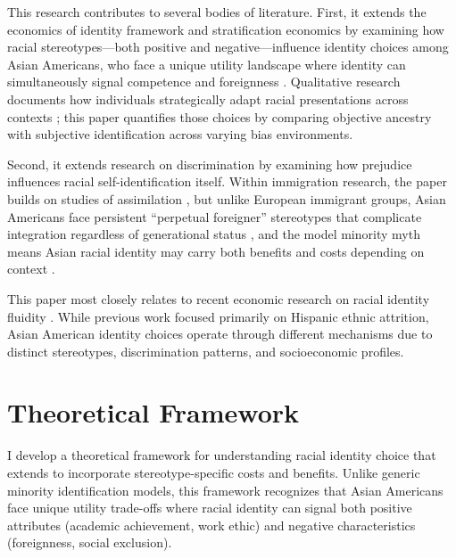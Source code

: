 \documentclass[12pt,english]{article}
\begin{document}
This research contributes to several bodies of literature. First, it extends the economics of identity framework \autocite{akerlofEconomicsIdentity2000} and stratification economics \autocite{darityEconomicsIdentityOrigin2006,darityPositionPossessionsStratification2022} by examining how racial stereotypes---both positive and negative---influence identity choices among Asian Americans, who face a unique utility landscape where identity can simultaneously signal competence and foreignness \autocite{charnessSocialIdentityGroup2020,atkinHowWeChoose2021,goldsmithDarkLightSkin2007,hamiltonSheddingLightMarriage2009,dietteSkinShadeStratification2015}. Qualitative research documents how individuals strategically adapt racial presentations across contexts \autocite{waters1990ethnic,telles2008generations,zhou1997segmented,cornell2006ethnicity}; this paper quantifies those choices by comparing objective ancestry with subjective identification across varying bias environments.

Second, it extends research on discrimination \autocite{bertrandAreEmilyGreg2004,charlesPrejudiceWagesEmpirical2008,bursztynImmigrantNextDoor2022,bordaloStereotypes2016} by examining how prejudice influences racial self-identification itself. Within immigration research, the paper builds on studies of assimilation \autocite{abramitzkyCulturalAssimilationAge2016,abramitzkyNationImmigrantsAssimilation2014}, but unlike European immigrant groups, Asian Americans face persistent ``perpetual foreigner'' stereotypes that complicate integration regardless of generational status \autocite{foukaImmigrantsAmericansRace2022}, and the model minority myth means Asian racial identity may carry both benefits and costs depending on context \autocite{mengIntermarriageEconomicAssimilation2005}.

This paper most closely relates to recent economic research on racial identity fluidity \autocite{hadah2024hispanicidentity, antmanEthnicAttritionObserved2016,antmanIncentivesIdentifyRacial2015,antmanAmericanIndianCasinos2021}. While previous work focused primarily on Hispanic ethnic attrition, Asian American identity choices operate through different mechanisms due to distinct stereotypes, discrimination patterns, and socioeconomic profiles.

\section{Theoretical Framework}\label{sec:model}

I develop a theoretical framework for understanding racial identity choice that extends \textcite{akerlofEconomicsIdentity2000} to incorporate stereotype-specific costs and benefits. Unlike generic minority identification models, this framework recognizes that Asian Americans face unique utility trade-offs where racial identity can signal both positive attributes (academic achievement, work ethic) and negative characteristics (foreignness, social exclusion).
\end{document}
